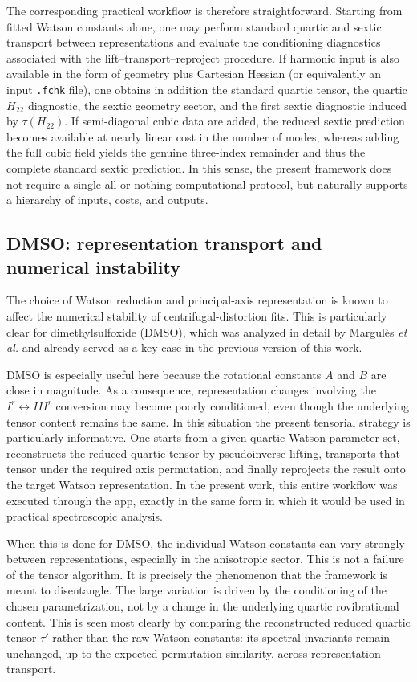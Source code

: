 \documentclass[journal=jacsat,manuscript=article]{achemso}
\begin{document}
The corresponding practical workflow is therefore straightforward.
Starting from fitted Watson constants alone, one may perform standard
quartic and sextic transport between representations and evaluate the
conditioning diagnostics associated with the lift--transport--reproject
procedure. If harmonic input is also available in the form of geometry
plus Cartesian Hessian (or equivalently an input \texttt{.fchk} file),
one obtains in addition the standard quartic tensor, the quartic
$H_{22}$ diagnostic, the sextic geometry sector, and the first sextic
diagnostic induced by $\tau(H_{22})$. If semi-diagonal cubic data are
added, the reduced sextic prediction becomes available at nearly linear
cost in the number of modes, whereas adding the full cubic field yields
the genuine three-index remainder and thus the complete standard sextic
prediction. In this sense, the present framework does not require a
single all-or-nothing computational protocol, but naturally supports a
hierarchy of inputs, costs, and outputs.

\subsection{DMSO: representation transport and numerical instability}

The choice of Watson reduction and principal-axis representation is known to
affect the numerical stability of centrifugal-distortion fits. This is
particularly clear for dimethylsulfoxide (DMSO), which was analyzed in detail
by Margul\`es \emph{et al.}\cite{Margules2010} and already served as a key case
in the previous version of this work.

DMSO is especially useful here because the rotational constants $A$ and $B$
are close in magnitude. As a consequence, representation changes involving the
$I^r \leftrightarrow III^r$ conversion may become poorly conditioned, even
though the underlying tensor content remains the same. In this situation the
present tensorial strategy is particularly informative. One starts from a
given quartic Watson parameter set, reconstructs the reduced quartic tensor by
pseudoinverse lifting, transports that tensor under the required axis
permutation, and finally reprojects the result onto the target Watson
representation. In the present work, this entire workflow was executed through
the app, exactly in the same form in which it would be used in practical
spectroscopic analysis.

When this is done for DMSO, the individual Watson constants can vary strongly
between representations, especially in the anisotropic sector. This is not a
failure of the tensor algorithm. It is precisely the phenomenon that the
framework is meant to disentangle. The large variation is driven by the
conditioning of the chosen parametrization, not by a change in the underlying
quartic rovibrational content. This is seen most clearly by comparing the
reconstructed reduced quartic tensor $\tau'$ rather than the raw Watson
constants: its spectral invariants remain unchanged, up to the expected
permutation similarity, across representation transport.
\end{document}
